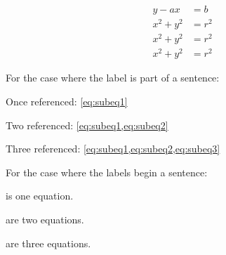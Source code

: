 \documentclass{article}
\begin{document}
\begin{subequations}
	\begin{align}
		y - ax &= b       \label{eq:subeq1}
		\\
		x^2 + y^2 &= r^2  \label{eq:subeq2}
		\\
		x^2 + y^2 &= r^2  \label{eq:subeq3}
		\\
		x^2 + y^2 &= r^2  \label{eq:subeq5}
	\end{align}
\end{subequations}

\noindent
For the case where the label is part of a sentence:
\par
Once referenced: \cref{eq:subeq1}
\par
Two referenced: \cref{eq:subeq1,eq:subeq2}
\par
Three referenced: \cref{eq:subeq1,eq:subeq2,eq:subeq3}
\par

\bigskip
\noindent
For the case where the labels begin a sentence:
\par
{} is one equation.
\par
{} are two equations.
\par
{} are three equations.
\end{document}
